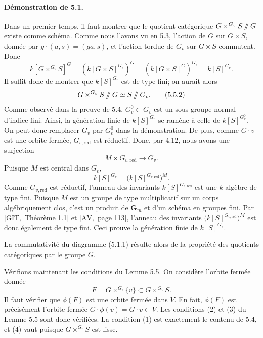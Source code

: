 \documentclass[11pt]{article}
\newcommand{\red}{\mathrm{red}}
\newcommand{\Gm}{\mathbf G_m}
\providecommand{\sslash}{\mathbin{/\mkern-6mu/}}
\begin{document}
\paragraph{Démonstration de 5.1.}
Dans un premier temps, il faut montrer que le quotient catégorique
\(G\times^{G_v}S\sslash G\) existe comme schéma. Comme nous l'avons vu en 5.3, l'action de
\(G\) sur \(G\times S\), donnée par \(g\cdot(a,s)=(ga,s)\), et l'action tordue de
\(G_v\) sur \(G\times S\) commutent. Donc
\begin{equation}
  k[G\times^{G_v}S]^G=(k[G\times S]^{G_v})^G=(k[G\times S]^G)^{G_v}=k[S]^{G_v}.
  \tag{5.5.1}
\end{equation}
Il suffit donc de montrer que \(k[S]^{G_v}\) est de type fini; on aurait alors
\begin{equation}
  G\times^{G_v}S\sslash G\simeq S\sslash G_v.
  \tag{5.5.2}
\end{equation}
Comme observé dans la preuve de 5.4, \(G_v^0\subset G_v\) est un sous-groupe normal
d'indice fini. Ainsi, la génération finie de \(k[S]^{G_v}\) se ramène à celle de
\(k[S]^{G_v^0}\). On peut donc remplacer \(G_v\) par \(G_v^0\) dans la démonstration.
De plus, comme \(G\cdot v\) est une orbite fermée, \(G_{v,\red}\) est réductif. Donc,
par 4.12, nous avons une surjection
\[
  M\times G_{v,\red}\longrightarrow G_v.
\]
Puisque \(M\) est central dans \(G_v\),
\[
  k[S]^{G_v}=\bigl(k[S]^{G_{v,\red}}\bigr)^M.
\]
Comme \(G_{v,\red}\) est réductif, l'anneau des invariants \(k[S]^{G_{v,\red}}\) est une
\(k\)-algèbre de type fini. Puisque \(M\) est un groupe de type multiplicatif sur un corps
algébriquement clos, c'est un produit de \(\Gm\) et d'un schéma en groupes fini. Par
\([\mathrm{GIT},\) Théorème 1.1] et \([\mathrm{AV},\) page 113], l'anneau des invariants
\(\bigl(k[S]^{G_{v,\red}}\bigr)^M\) est donc également de type fini. Ceci prouve la
génération finie de \(k[S]^{G_v}\).

La commutativité du diagramme (5.1.1) résulte alors de la propriété des quotients
catégoriques par le groupe \(G\).

Vérifions maintenant les conditions du Lemme 5.5. On considère l'orbite fermée donnée
\[
  F=G\times^{G_v}\{v\}\subset G\times^{G_v}S.
\]
Il faut vérifier que \(\phi(F)\) est une orbite fermée dans \(V\). En fait,
\(\phi(F)\) est précisément l'orbite fermée \(G\cdot\phi(v)=G\cdot v\subset V\). Les
conditions (2) et (3) du Lemme 5.5 sont donc vérifiées. La condition (1) est exactement le
contenu de 5.4, et (4) vaut puisque \(G\times^{G_v}S\) est lisse.
\end{document}
